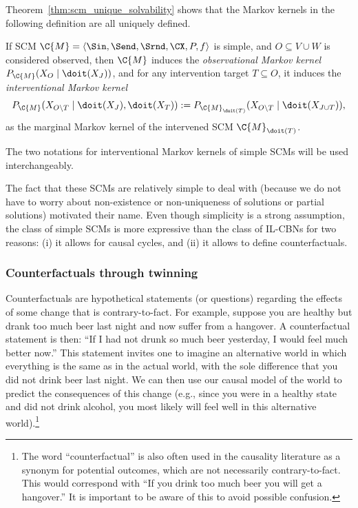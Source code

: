 Theorem~\ref{thm:scm_unique_solvability} shows that the Markov kernels in the following definition are all uniquely defined.
\begin{Def}\label{def:simple_scm_Markov_kernels}
  If SCM $\C{M} = \langle \Sin, \Send, \Srnd, \CX, P, f \rangle$ is simple, and $O \subseteq V \cup W$ is considered observed,
  then $\C{M}$ induces the \emph{observational Markov kernel $P_{\C{M}}(X_O \mid \doit(X_J))$}, and for any intervention target 
  $T \subseteq O$, it induces the \emph{interventional Markov kernel}
  $$P_{\C{M}}(X_{O\setminus T} \mid \doit(X_J),\doit(X_T)) := P_{\C{M}_{\doit(T)}}(X_{O\setminus T} \mid \doit(X_{J \cup T})),$$
  as the marginal Markov kernel of the intervened SCM $\C{M}_{\doit(T)}$.
\end{Def}
The two notations for interventional Markov kernels of simple SCMs will be used interchangeably.

The fact that these SCMs are relatively simple to deal with (because we do not have to worry about non-existence or 
non-uniqueness of solutions or partial solutions) motivated their name.
Even though simplicity is a strong assumption, 
the class of simple SCMs is more expressive than the class of IL-CBNs for two reasons: (i) it allows for
causal cycles, and (ii) it allows to define counterfactuals.

\subsubsection{Counterfactuals through twinning}\label{sec:counterfactuals}

Counterfactuals are hypothetical statements (or questions) regarding the effects of some change that is contrary-to-fact.
For example, suppose you are healthy but drank too much beer last night and now suffer from a hangover. 
A counterfactual statement is then: ``If I had not drunk so much beer yesterday, I would feel much better now.''
This statement invites one to imagine an alternative world in which everything is the same as in the actual world,
with the sole difference that you did not drink beer last night. We can then use our causal model of the world to predict the
consequences of this change (e.g., since you were in a healthy state and did not drink alcohol, you most likely will
feel well in this alternative world).\footnote{The word ``counterfactual'' is also often used in the causality literature 
as a synonym for potential outcomes, which are not necessarily contrary-to-fact. This would correspond with ``If you drink
too much beer you will get a hangover.'' It is important to be aware of this to avoid possible confusion.}

